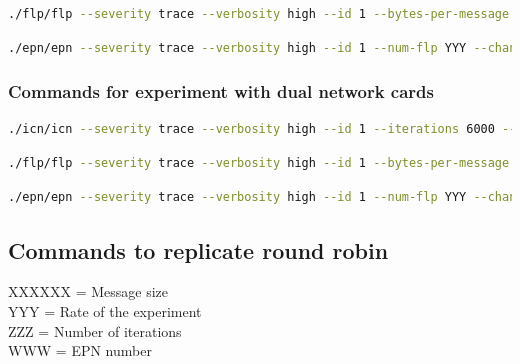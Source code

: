 \documentclass[]{article}
\begin{document}
\begin{lstlisting}[language=bash]
./flp/flp --severity trace --verbosity high --id 1 --bytes-per-message XXXXXX --channel-config name=broadcast,type=sub,method=connect,rateLogging=1,address=tcp://192.168.1.4:5005
\end{lstlisting}

\begin{lstlisting}[language=bash]
./epn/epn --severity trace --verbosity high --id 1 --num-flp YYY --channel-config name=1,type=pull,method=bind,address=tcp://*:5555,rateLogging=1 name=feedback,type=push,method=connect,address=tcp://192.168.1.4:5000
\end{lstlisting}

\subsubsection{Commands for experiment with dual network cards}
\begin{lstlisting}[language=bash]
./icn/icn --severity trace --verbosity high --id 1 --iterations 6000 --rate 200 --channel-config name=broadcast,type=pub,method=bind,rateLogging=0,address=tcp://*:5005 name=feedback,type=pull,method=bind,rateLogging=0,address=tcp://*:5000
\end{lstlisting}

\begin{lstlisting}[language=bash]
./flp/flp --severity trace --verbosity high --id 1 --bytes-per-message XXXXXX --channel-config name=broadcast,type=sub,method=connect,rateLogging=1,address=tcp://10.42.0.138:5005
\end{lstlisting}

\begin{lstlisting}[language=bash]
./epn/epn --severity trace --verbosity high --id 1 --num-flp YYY --channel-config name=1,type=pull,method=bind,address=tcp://*:5555,rateLogging=1 name=feedback,type=push,method=connect,address=tcp://10.42.0.138:5000
\end{lstlisting}

\subsection{Commands to replicate round robin}
\label{sec:appendix02}
XXXXXX = Message size \\
YYY = Rate of the experiment \\
ZZZ = Number of iterations \\
WWW = EPN number
\end{document}
